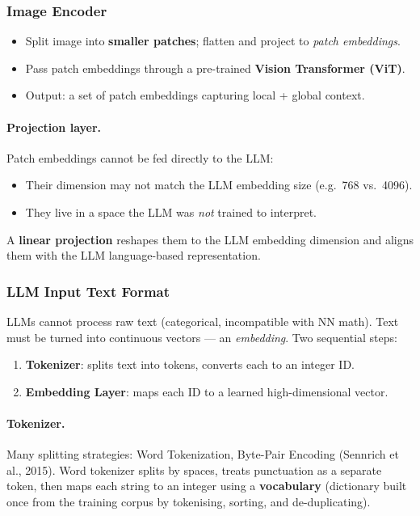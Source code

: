\documentclass[11pt,a4paper]{article}
\theoremstyle{definition}
\theoremstyle{plain}
\theoremstyle{remark}
\begin{document}
\subsubsection{Image Encoder}

\begin{itemize}
    \item Split image into \textbf{smaller patches}; flatten and project to \emph{patch embeddings}.
    \item Pass patch embeddings through a pre-trained \textbf{Vision Transformer (ViT)}.
    \item Output: a set of patch embeddings capturing local + global context.
\end{itemize}

\paragraph{Projection layer.} Patch embeddings cannot be fed directly to the LLM:
\begin{itemize}
    \item Their dimension may not match the LLM embedding size (e.g.\ 768 vs.\ 4096).
    \item They live in a space the LLM was \emph{not} trained to interpret.
\end{itemize}
A \textbf{linear projection} reshapes them to the LLM embedding dimension and aligns them with the LLM language-based representation.

\subsubsection{LLM Input Text Format}

LLMs cannot process raw text (categorical, incompatible with NN math). Text must be turned into continuous vectors --- an \emph{embedding}. Two sequential steps:
\begin{enumerate}
    \item \textbf{Tokenizer}: splits text into tokens, converts each to an integer ID.
    \item \textbf{Embedding Layer}: maps each ID to a learned high-dimensional vector.
\end{enumerate}

\paragraph{Tokenizer.} Many splitting strategies: Word Tokenization, Byte-Pair Encoding (Sennrich et al., 2015). Word tokenizer splits by spaces, treats punctuation as a separate token, then maps each string to an integer using a \textbf{vocabulary} (dictionary built once from the training corpus by tokenising, sorting, and de-duplicating).
\end{document}
